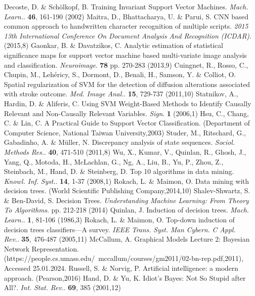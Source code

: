 \documentclass[sn-mathphys-num]{sn-jnl}%
\begin{document}
\begin{thebibliography}{000}
Decoste, D. \& Schölkopf, B. Training Invariant Support Vector Machines. {\em Mach. Learn.}. \textbf{46}, 161-190 (2002)
Maitra, D., Bhattacharya, U. \& Parui, S. CNN based common approach to handwritten character recognition of multiple scripts. {\em 2015 13th International Conference On Document Analysis And Recognition (ICDAR)}. (2015,8)
Gaonkar, B. \& Davatzikos, C. Analytic estimation of statistical significance maps for support vector machine based multi-variate image analysis and classification. {\em Neuroimage}. \textbf{78} pp. 270-283 (2013,9)
Cuingnet, R., Rosso, C., Chupin, M., Lehéricy, S., Dormont, D., Benali, H., Samson, Y. \& Colliot, O. Spatial regularization of SVM for the detection of diffusion alterations associated with stroke outcome. {\em Med. Image Anal.}. \textbf{15}, 729-737 (2011,10)
Statnikov, A., Hardin, D. \& Aliferis, C. Using SVM Weight-Based Methods to Identify Causally Relevant and Non-Causally Relevant Variables. {\em Sign}. \textbf{1} (2006,1)
Hsu, C., Chang, C. \& Lin, C. A Practical Guide to Support Vector Classification. (Department of Computer Science, National Taiwan University,2003)
Studer, M., Ritschard, G., Gabadinho, A. \& Müller, N. Discrepancy analysis of state sequences. {\em Sociol. Methods Res.}. \textbf{40}, 471-510 (2011,8)
Wu, X., Kumar, V., Quinlan, R., Ghosh, J., Yang, Q., Motoda, H., McLachlan, G., Ng, A., Liu, B., Yu, P., Zhou, Z., Steinbach, M., Hand, D. \& Steinberg, D. Top 10 algorithms in data mining. {\em Knowl. Inf. Syst.}. \textbf{14}, 1-37 (2008,1)
Rokach, L. \& Maimon, O. Data mining with decision trees. (World Scientific Publishing Company,2014,10)
Shalev-Shwartz, S. \& Ben-David, S. Decision Trees. {\em Understanding Machine Learning: From Theory To Algorithms}. pp. 212-218 (2014)
Quinlan, J. Induction of decision trees. {\em Mach. Learn.}. \textbf{1}, 81-106 (1986,3)
Rokach, L. \& Maimon, O. Top-down induction of decision trees classifiers—A survey. {\em IEEE Trans. Syst. Man Cybern. C Appl. Rev.}. \textbf{35}, 476-487 (2005,11)
McCallum, A. Graphical Models Lecture 2: Bayesian Network Representation. (https://people.cs.umass.edu/ mccallum/courses/gm2011/02-bn-rep.pdf,2011), Accessed 25.01.2024.
Russell, S. \& Norvig, P. Artificial intelligence: a modern approach. (Pearson,2016)
Hand, D. \& Yu, K. Idiot's Bayes: Not So Stupid after All?. {\em Int. Stat. Rev.}. \textbf{69}, 385 (2001,12)

\end{thebibliography}
\end{document}
